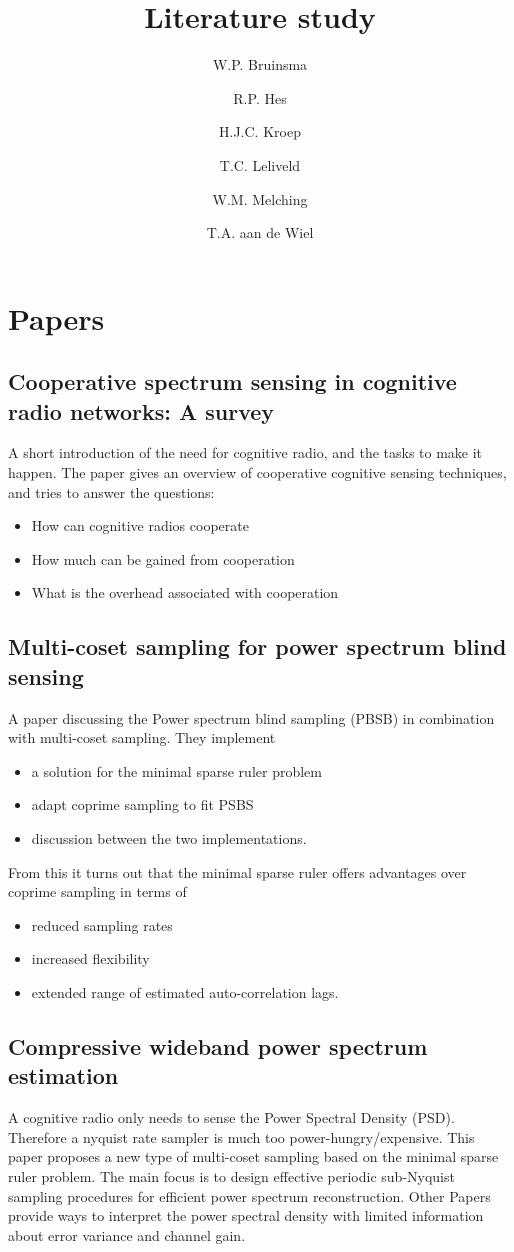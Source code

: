 \documentclass[report, oneside, a4paper, openany]{memoir}
\title{Literature study}
\author{W.P. Bruinsma \and R.P. Hes \and H.J.C. Kroep \and T.C. Leliveld \and W.M. Melching \and T.A. aan de Wiel}
\begin{document}
\chapter{Papers}
\section{Cooperative spectrum sensing in cognitive radio networks: A survey \cite{akyildiz2011cooperative}}
%
A short introduction of the need for cognitive radio, and the tasks to make it happen.
The paper gives an overview of cooperative cognitive sensing techniques, and tries to answer the questions:

\begin{itemize}
	\item How can cognitive radios cooperate
	\item How much can be gained from cooperation
	\item What is the overhead associated with cooperation
\end{itemize}

\section{Multi-coset sampling for power spectrum blind sensing \cite{ariananda2011multicoset}}

A paper discussing the Power spectrum blind sampling (PBSB) in combination with multi-coset sampling. They implement
\begin{itemize}
    \item a solution for the minimal sparse ruler problem
    \item adapt coprime sampling to fit PSBS
    \item discussion between the two implementations.
\end{itemize}
From this it turns out that the minimal sparse ruler offers advantages over coprime sampling in terms of
\begin{itemize}
    \item reduced sampling rates
    \item increased flexibility
    \item extended range of estimated auto-correlation lags.
\end{itemize}
\section{Compressive wideband power spectrum estimation \cite{ariananda2012compressive}}
%
A cognitive radio only needs to sense the Power Spectral Density (PSD). Therefore a nyquist rate sampler is much too power-hungry/expensive. This paper proposes a new type of multi-coset sampling based on the minimal sparse ruler problem. The main focus is to design effective periodic sub-Nyquist sampling procedures for efficient power spectrum reconstruction. Other Papers provide ways to interpret the power spectral density with limited information about error variance and channel gain.
\end{document}
